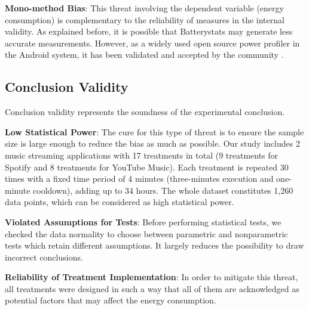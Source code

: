 \textbf{Mono-method Bias}: This threat involving the dependent variable (\ie energy consumption) is complementary to the reliability of measures in the internal validity. As explained before, it is possible that Batterystats may generate less accurate measurements. However, as a widely used open source power profiler in the Android system, it has been validated and accepted by the community \cite{39}.     

\subsection{Conclusion Validity}
Conclusion validity represents the soundness of the experimental conclusion. 

\textbf{Low Statistical Power}: The cure for this type of threat is to ensure the sample size is large enough to reduce the bias as much as possible. Our study includes 2 music streaming applications with 17 treatments in total (9 treatments for Spotify and 8 treatments for YouTube Music). Each treatment is repeated 30 times with a fixed time period of 4 minutes (three-minutes execution and one-minute cooldown), adding up to 34 hours. The whole dataset constitutes 1,260 data points, which can be considered as high statistical power.

\textbf{Violated Assumptions for Tests}: Before performing statistical tests, we checked the data normality to choose between parametric and nonparametric tests which retain different assumptions. It largely reduces the possibility to draw incorrect conclusions.

\textbf{Reliability of Treatment Implementation}: In order to mitigate this threat, all treatments were designed in such a way that all of them are acknowledged as potential factors that may affect the energy consumption. 



